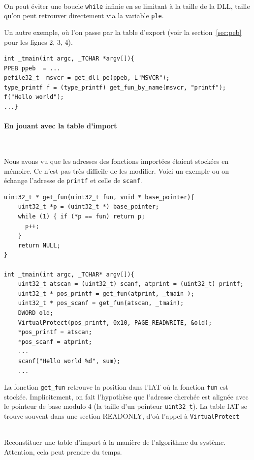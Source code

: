 \documentclass{book}
\newenvironment{commentaire}[1]{%
	\def\FrameCommand{\fboxrule=\FrameRule\fboxsep=\FrameSep \fcolorbox{yellow!50}{yellow!10}}%
	\MakeFramed {\advance\hsize-\width \FrameRestore}
	\noindent {\bf #1}\\
}%
{\endMakeFramed}
\newcommand{\code}[1]{\texttt{#1}}
\begin{document}
\begin{commentaire}{Pour faire mieux}
	On peut éviter une boucle \code{while} infinie en se limitant à la taille de la DLL, taille qu'on peut retrouver directement via la variable \code{ple}. 
\end{commentaire}

Un autre exemple, où l'on passe par la table d'export (voir la section~\ref{sec:peb} pour les lignes 2, 3, 4). 

\begin{verbatim}
int _tmain(int argc, _TCHAR *argv[]){
PPEB ppeb  = ...
pefile32_t  msvcr = get_dll_pe(ppeb, L"MSVCR");
type_printf f = (type_printf) get_fun_by_name(msvcr, "printf");
f("Hello world");
...}
\end{verbatim}

\paragraph{En jouant avec la table d'import}~

Nous avons vu que les adresses des fonctions importées étaient stockées en mémoire. Ce n'est pas très difficile de les modifier. Voici un exemple ou on échange l'adresse de \code{printf} et celle de \code{scanf}.

\begin{verbatim}
uint32_t * get_fun(uint32_t fun, void * base_pointer){
	uint32_t *p = (uint32_t *) base_pointer;
	while (1) { if (*p == fun) return p;
	  p++;
	}
	return NULL;
}

int _tmain(int argc, _TCHAR* argv[]){
	uint32_t atscan = (uint32_t) scanf, atprint = (uint32_t) printf;
	uint32_t * pos_printf = get_fun(atprint, _tmain );
	uint32_t * pos_scanf = get_fun(atscan, _tmain);
	DWORD old;
	VirtualProtect(pos_printf, 0x10, PAGE_READWRITE, &old);
	*pos_printf = atscan;
	*pos_scanf = atprint;
	...
	scanf("Hello world %d", sum);
	...
\end{verbatim}

La fonction \code{get\_fun} retrouve la position dans l'IAT où la fonction \code{fun} est stockée. Implicitement, on fait l'hypothèse que l'adresse cherchée est alignée avec le pointeur de base modulo 4 (la taille d'un pointeur \code{uint32\_t}). La table IAT se trouve souvent dans une section READONLY, d'où l'appel à \code{VirtualProtect}


\begin{commentaire}{Pour aller plus loin}
	Reconstituer une table d'import à la manière de l'algorithme du système. Attention, cela peut prendre du temps. 
\end{commentaire}
\end{document}
